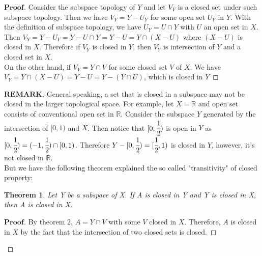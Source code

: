 \documentclass[a4paper, 11pt]{article}
\newtheorem{theorem}{Theorem}
\theoremstyle{remark}
\newenvironment{myremark}
{\renewcommand\qedsymbol{$ $}\begin{proof}[$\mathbf{REMARK}$]}
  {\end{proof}}
\newenvironment{myprf}
{\renewcommand\qedsymbol{$ $}\begin{proof}[$\mathbf{Proof}$]}
  {\end{proof}}
\theoremstyle{definition}
\begin{document}
\begin{myprf}
        Consider the subspace topology of $Y$ and let $V_{Y}$ is a closed set under such
        subspace topology. Then we have $V_{Y}=Y-U_{Y}$ for some open set
        $U_{Y}$ in $Y$. With the definition of subspace topology, we have 
        $U_{Y}=U\cap Y$ with $U$ an open set in $X$. Then $V_{Y}=Y-U_{Y}
        =Y-U\cap Y=Y-U=Y\cap (X-U)$ where $(X-U)$ is closed in $X$. Therefore 
        if $V_{Y}$ is closed in $Y$, then $V_{Y}$ is intersection of $Y$ and a 
        closed set in $X$. \\
        On the other hand, if $V_{Y}=Y\cap V$ for some closed 
        set $V$ of $X$. We have $V_{Y}=Y\cap (X-U)=Y-U=Y-(Y\cap U)$, which is 
        closed in $Y$
\end{myprf}
\begin{myremark}
        General speaking, a set that is closed in a subspace may not be closed in the larger 
        topological space. For example, let $X=\mathbb{R}$ and open set consists
        of conventional open set in $\mathbb{R}$. Consider the subspace $Y$ generated
        by the intersection of $[0,1)$ and $X$. Then notice that $[0,\cfrac{1}{2})$
        is open in $Y$ as $[0,\cfrac{1}{2})=(-1,\cfrac{1}{2})\cap [0,1)$. Therefore
        $Y-[0,\cfrac{1}{2})=[\cfrac{1}{2},1)$ is closed in $Y$, however, it's not
        closed in $\mathbb{R}$.\\
        But we have the following theorem explained the so called "transitivity"
        of closed property:
        \vspace{0.1cm}
        \begin{theorem}
               Let Y be a subspace of X. If A is closed in Y and Y is closed in X,
               then A is closed in X.
        \end{theorem}
        \begin{myprf}
               By theorem 2, $A=Y\cap V$ with some $V$ closed in $X$. 
               Therefore, $A$
               is closed in $X$ by the fact that the intersection of two closed 
               sets is closed.
        \end{myprf}
\end{myremark}
\end{document}
